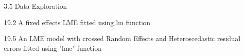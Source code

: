 3.5 Data Exploration

19.2 A fixed effects LME fitted using lm function

19.5 An LME model with crossed Random Effects and Heteroscedastic residual errors
fitted using "lme" function
